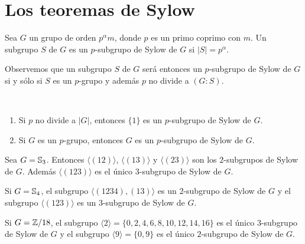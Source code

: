 \chapter{Los teoremas de Sylow}

\begin{definition}
Sea $G$ un grupo de orden $p^\alpha m$, donde $p$ es un primo coprimo con $m$. Un subgrupo $S$ de $G$ es 
un $p$-subgrupo	de Sylow de $G$ si $|S|=p^\alpha$. 
\end{definition}

Observemos que un subgrupo $S$ de $G$ será entonces un $p$-subgrupo de Sylow de $G$ si y sólo si $S$ es un $p$-grupo y además $p$ no divide a $(G:S)$. 

\begin{examples}\
\begin{enumerate}
\item Si $p$ no divide a $|G|$, entonces $\{1\}$ es un $p$-subgrupo de Sylow de $G$. 
\item Si $G$ es un $p$-grupo, entonces $G$ es un $p$-subgrupo de Sylow de $G$.
\end{enumerate}	
\end{examples}

\begin{example}
Sea $G=\mathbb{S}_3$. Entonces $\langle (12)\rangle$, $\langle (13)\rangle$ y $\langle (23)\rangle$ son los $2$-subgrupos de Sylow de $G$. Además
$\langle (123)\rangle$ es el único $3$-subgrupo de Sylow de $G$.	
\end{example}

\begin{example}
Si $G=\mathbb{S}_4$, el subgrupo $\langle (1234),(13)\rangle$ es un $2$-subgrupo de Sylow de $G$ y
el subgrupo $\langle (123)\rangle$ es un $3$-subgrupo de Sylow de $G$. 	
\end{example}

\begin{example}
Si $G=\mathbb{Z}/18$, el subgrupo $\langle 2\rangle =\{0,2,4,6,8,10,12,14,16\}$ es el único $3$-subgrupo
de Sylow de $G$ y el subgrupo $\langle 9\rangle=\{0,9\}$ es el único $2$-subgrupo de Sylow de $G$. 	
\end{example}

